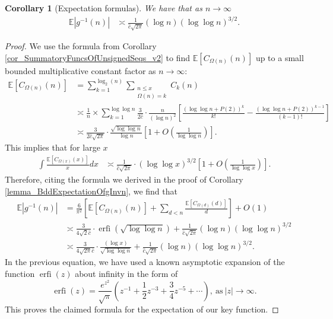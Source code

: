 \documentclass[11pt,reqno,a4letter]{article}
\numberwithin{figure}{section}
\numberwithin{table}{section}
\theoremstyle{plain}
\newtheorem{cor}[theorem]{Corollary}
\numberwithin{theorem}{section}
\theoremstyle{definition}
\begin{document}
\begin{cor}[Expectation formulas] 
We have that as $n \rightarrow \infty$ 
\begin{align*} 
\mathbb{E}|g^{-1}(n)| & \asymp \frac{1}{\hat{c} \sqrt{2\pi}} (\log n) (\log\log n)^{3/2}. 
\end{align*} 
\end{cor} 
\begin{proof} 
We use the formula from Corollary \ref{cor_SummatoryFuncsOfUnsignedSeqs_v2} 
to find $\mathbb{E}[C_{\Omega(n)}(n)]$ up to a small bounded multiplicative 
constant factor as $n \rightarrow \infty$: 
\begin{align*} 
\mathbb{E}[C_{\Omega(n)}(n)] & = 
     \sum_{k=1}^{\log_2(n)} \sum_{\substack{n \leq x \\ \Omega(n) = k}} C_k(n) \\ 
     & \asymp \frac{1}{n} \times 
     \sum_{k=1}^{\log\log n} \frac{3}{2\hat{c}} \cdot \frac{n}{(\log n)^2} \left[ 
     \frac{(\log\log n + P(2))^{k}}{k!} - \frac{(\log\log n + P(2))^{k-1}}{(k-1)!}
     \right] \\ 
     & \asymp \frac{3}{2\hat{c} \sqrt{2\pi}} \cdot \frac{\sqrt{\log\log n}}{\log n}\left[1 + 
     O\left(\frac{1}{\log\log n}\right)\right]. 
\end{align*} 
This implies that for large $x$ 
\begin{align*} 
\int \frac{\mathbb{E}[C_{\Omega(x)}(x)]}{x} dx & \asymp 
     \frac{1}{\hat{c} \sqrt{2\pi}} \cdot (\log\log x)^{3/2} \left[1 + 
     O\left(\frac{1}{\log\log x}\right)\right]. 
\end{align*} 
Therefore, citing the formula we derived in the proof of 
Corollary \ref{lemma_BddExpectationOfgInvn}, we find that 
\begin{align*} 
\mathbb{E}|g^{-1}(n)| & = \frac{6}{\pi^2}\left[\mathbb{E}[C_{\Omega(n)}(n)] + 
     \sum_{d<n} \frac{\mathbb{E}[C_{\Omega(d)}(d)]}{d}\right] + O(1) \\ 
     & \asymp \frac{3}{4\sqrt{2} \hat{c}} \cdot \operatorname{erfi}\left(\sqrt{\log\log n}\right) + 
     \frac{1}{\hat{c} \sqrt{2\pi}} (\log n) (\log\log n)^{3/2} \\ 
     & \asymp \frac{3}{4\sqrt{2\pi} \hat{c}} \cdot \frac{(\log x)}{\sqrt{\log\log n}} + 
     \frac{1}{\hat{c} \sqrt{2\pi}} (\log n) (\log\log n)^{3/2}. 
\end{align*} 
In the previous equation, we have used a known asymptotic expansion of the function $\operatorname{erfi}(z)$ 
about infinity in the form of \cite[\S 3.2]{INCGAMMA-BOOK} 
\[
\operatorname{erfi}(z) = \frac{e^{z^2}}{\sqrt{\pi}} \left(z^{-1} + \frac{1}{2}z^{-3} + \frac{3}{4}z^{-5} + \cdots \right), 
     \mathrm{\ as\ } |z| \rightarrow \infty. 
\]
This proves the claimed formula for the expectation of our key function. 
\end{proof} 
\end{document}
